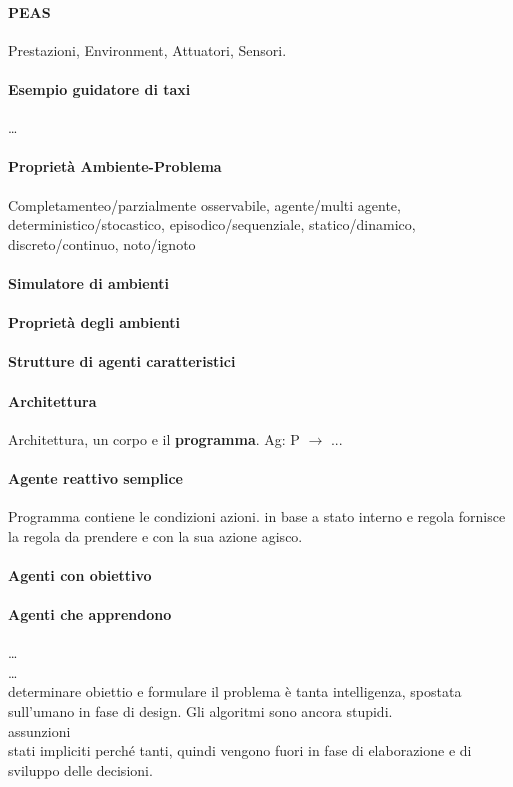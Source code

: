 \documentclass[10pt]{book}
\begin{document}
\paragraph{PEAS} Prestazioni, Environment, Attuatori, Sensori.
\paragraph{Esempio guidatore di taxi} \ldots
\paragraph{Proprietà Ambiente-Problema} Completamenteo/parzialmente osservabile, agente/multi agente, deterministico/stocastico, episodico/sequenziale, statico/dinamico, discreto/continuo, noto/ignoto
\paragraph{Simulatore di ambienti}
\paragraph{Proprietà degli ambienti}
\paragraph{Strutture di agenti caratteristici}
\paragraph{Architettura} Architettura, un corpo e il \textbf{programma}. Ag: P $\longrightarrow$ ...
\paragraph{Agente reattivo semplice} Programma contiene le condizioni azioni. in base a stato interno e regola fornisce la regola da prendere e con la sua azione agisco.
\paragraph{Agenti con obiettivo}
\paragraph{Agenti che apprendono}
\ldots\\
\ldots\\
determinare obiettio e formulare il problema è tanta intelligenza, spostata sull'umano in fase di design. Gli algoritmi sono ancora stupidi.\\
assunzioni\\
stati impliciti perché tanti, quindi vengono fuori in fase di elaborazione e di sviluppo delle decisioni.\\
\end{document}
